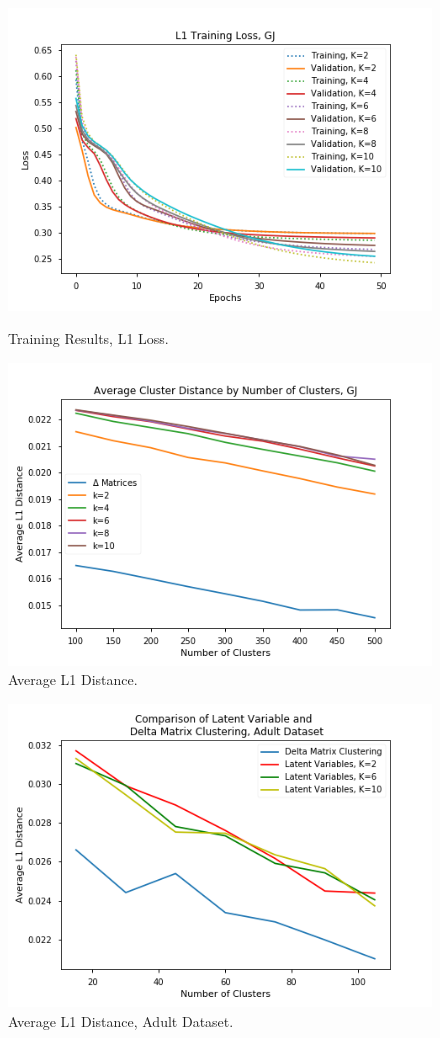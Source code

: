 \documentclass{article}
\begin{document}
\begin{figure}
  \centering
  \includegraphics[width= \columnwidth]{training.png}
  \caption{\label{fig:train} Training Results, L1 Loss.}
  \includegraphics[width= \columnwidth]{clust_dist.png}
  \caption{\label{fig:clust_dist} Average L1 Distance.}
\end{figure}

\begin{figure}
  \centering
  \includegraphics[width= \columnwidth]{adult}
  \caption{\label{fig:adult} Average L1 Distance, Adult Dataset.}
\end{figure}
\end{document}
